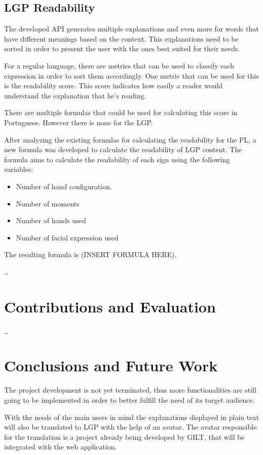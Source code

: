 \documentclass[runningheads]{llncs}
\begin{document}
\subsection{LGP Readability}

The developed API generates multiple explanations and even more for words that have different meanings based on the context.
This explanations need to be sorted in order to present the user with the ones best suited for their needs.

For a regular language, there are metrics that can be used to classify each expression in order to sort them accordingly.
One metric that can be used for this is the readability score.
This score indicates how easily a reader would understand the explanation that he's reading.

There are multiple formulas that could be used for calculating this score in Portuguese.
However there is none for the LGP.

After analyzing the existing formulas for calculating the readability for the PL, a new formula was developed to calculate the readability of LGP content.
The formula aims to calculate the readability of each sign using the following variables:

\begin{itemize}
    \item Number of hand configuration.
    \item Number of moments
    \item Number of hands used
    \item Number of facial expression used
\end{itemize}

The resulting formula is (INSERT FORMULA HERE).

\dots

\section{Contributions and Evaluation}

\dots

\section{Conclusions and Future Work}

The project development is not yet terminated, thus more functionalities are still going to be implemented in order to better fulfill the need of its target audience.

With the needs of the main users in mind the explanations displayed in plain text will also be translated to LGP with the help of an avatar.
The avatar responsible for the translation is a project already being developed by GILT, that will be integrated with the web application.
\end{document}
